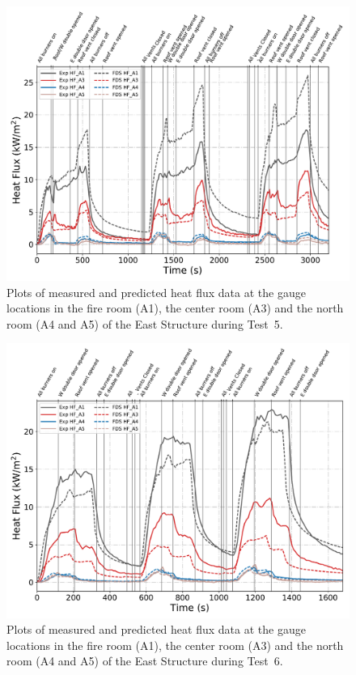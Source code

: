\begin{figure}[!h]
	\centering
	\includegraphics[width=\columnwidth]{Figures/Plots/Validation/Heat_Flux/Test_5_HFs}
	\caption[Plots of measured and predicted heat flux data during Test~5.]{Plots of measured and predicted heat flux data at the gauge locations in the fire room (A1), the center room (A3) and the north room (A4 and A5) of the East Structure during Test~5.}
	\label{fig:Test5_HFs}
\end{figure}

\begin{figure}[!h]
	\centering
	\includegraphics[width=\columnwidth]{Figures/Plots/Validation/Heat_Flux/Test_6_HFs}
	\caption[Plots of measured and predicted heat flux data during Test~6.]{Plots of measured and predicted heat flux data at the gauge locations in the fire room (A1), the center room (A3) and the north room (A4 and A5) of the East Structure during Test~6.}
	\label{fig:Test6_HFs}
\end{figure}

